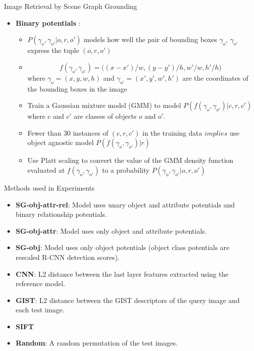 \documentclass{IFES-beamer}
\begin{document}
    \begin{frame}{Image Retrieval by Scene Graph Grounding}
        \begin{itemize}
            \item \textbf{Binary potentials} : 
                \begin{itemize}
                    \item $P(\gamma_o, \gamma_{o'}|o,r,o')$ models how well the pair of bounding boxes $\gamma_o$, $\gamma_{o'}$ express the tuple $(o, r, o')$
                    \item $$f(\gamma_o, \gamma_{o'}) = \Big( (x-x')/w, (y-y')/h, w'/w, h'/h \Big)$$
                    where $\gamma_o = (x, y, w, h)$ and $\gamma_{o'} = (x', y', w', h')$ are the coordinates of the bounding boxes in the image
                    \item Train a Gaussian mixture model (GMM) to model $P(f(\gamma_o, \gamma_{o'})|c,r,c')$ where $c$ and $c'$ are classes of objects $o$ and $o'$.
                    \item Fewer than 30 instances of $(c,r,c')$ in the training data $implies$ use object agnostic model $P(f(\gamma_o, \gamma_{o'})|r)$
                    \item Use Platt scaling to convert the value of the GMM density function evaluated at $f(\gamma_o, \gamma_{o'})$ to a probability $P(\gamma_o, \gamma_{o'}|o,r,o')$
                \end{itemize}
        \end{itemize}
    \end{frame}
    
    \begin{frame}{Methods used in Experiments}
        \begin{itemize}
            \item \textbf{SG-obj-attr-rel}: Model uses unary object and attribute potentials and binary relationship potentials.
            \item \textbf{SG-obj-attr}: Model uses only object and attribute potentials.
            \item \textbf{SG-obj}: Model uses only object potentials (object class potentials are rescaled R-CNN detection scores).
            \item \textbf{CNN}: L2 distance between the last layer features extracted using the reference model.
            \item \textbf{GIST}\cite{oliva2001modeling}: L2 distance between the GIST descriptors of the query image and each test image.
            \item \textbf{SIFT}\cite{lowe2004distinctive}
            \item \textbf{Random}: A random permutation of the test images.
        \end{itemize}
    \end{frame}
    
\end{document}
